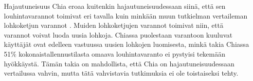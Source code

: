 \begin{section}{Hajautuneisuus\label{hajautuneisuus}}
Chia eroaa kuitenkin hajautuneisuudessaan siinä, että sen louhintavarannot toimivat eri tavalla kuin minkään muun tutkielman vertaileman lohkoketjun varannot \cite{chia-pooling-difference-1,chia-pooling-difference-2}. Muiden lohkoketjujen varannot toimivat niin, että varannot voivat luoda uusia lohkoja. Chiassa puolestaan varantoon kuuluvat käyttäjät ovat edelleen vastuussa uusien lohkojen luomisesta, minkä takia Chiassa 51\% kokonaistallennustilasta omaava louhintavaranto ei pystyisi tekemään hyökkäystä. Tämän takia on mahdollista, että Chia on hajautuneisuudessaan vertailussa vahvin, mutta tätä vahvistavia tutkimuksia ei ole toistaiseksi tehty.

 \end{section}